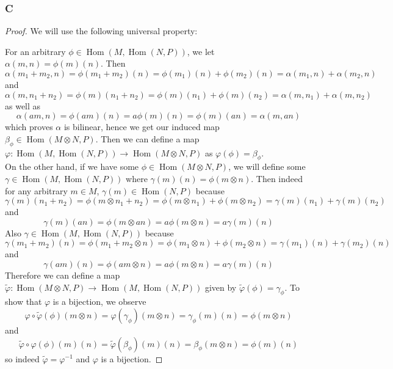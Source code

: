 \documentclass{article}
\DeclareMathOperator{\Hom}{Hom}
\begin{document}
\subsubsection{C}\label{1.5.C}
\begin{proof}
    We will use the following universal property:
    \begin{center}
    \end{center}
    For an arbitrary $\phi\in \Hom(M, \Hom(N,P))$, we let $\alpha(m,n)=\phi(m)(n)$. Then
    \[
    \alpha(m_1+m_2,n)=\phi(m_1+m_2)(n)=\phi(m_1)(n)+\phi(m_2)(n)=\alpha(m_1,n)+\alpha(m_2,n)
    \]
    and
    \[
    \alpha(m,n_1+n_2)=\phi(m)(n_1+n_2)=\phi(m)(n_1)+\phi(m)(n_2)=\alpha(m,n_1)+\alpha(m,n_2)
    \]
    as well as
    \[
    \alpha(am,n)=\phi(am)(n)=a\phi(m)(n)=\phi(m)(an)=\alpha(m,an)
    \]
    which proves $\alpha$ is bilinear, hence we get our induced map $\beta_\phi \in \Hom(M\otimes N, P)$. Then we can define a map $\varphi:\Hom(M, \Hom(N,P))\to \Hom(M\otimes N, P)$ as $\varphi(\phi)=\beta_\phi$.\\
    \newline
    On the other hand, if we have some $\phi \in \Hom(M\otimes N,P)$, we will define some $\gamma \in \Hom(M, \Hom(N,P))$ where $\gamma(m)(n)=\phi(m\otimes n)$. Then indeed for any arbitrary $m\in M$, $\gamma(m)\in \Hom(N,P)$ because
    \[
    \gamma(m)(n_1+n_2)=\phi(m\otimes n_1+n_2)=\phi(m\otimes n_1)+\phi(m\otimes n_2)=\gamma(m)(n_1)+\gamma(m)(n_2)
    \]
    and
    \[
    \gamma(m)(an)=\phi(m\otimes an)=a\phi(m\otimes n)=a\gamma(m)(n)
    \]
    Also $\gamma \in \Hom(M, \Hom(N,P))$ because
    \[
    \gamma(m_1+m_2)(n)=\phi(m_1+m_2\otimes n)=\phi(m_1\otimes n)+\phi(m_2\otimes n)=\gamma(m_1)(n)+\gamma(m_2)(n)
    \]
    and
    \[
    \gamma(am)(n)=\phi(am\otimes n)=a\phi(m\otimes n)=a\gamma(m)(n)
    \]
    Therefore we can define a map $\tilde \varphi:\Hom(M\otimes N,P)\to \Hom(M, \Hom(N,P))$ given by $\tilde \varphi(\phi)=\gamma_\phi$. To show that $\varphi$ is a bijection, we observe
    \[
    \varphi \circ \tilde \varphi(\phi)(m\otimes n)=\varphi(\gamma_\phi)(m\otimes n)=\gamma_\phi(m)(n)=\phi(m\otimes n)
    \]
    and
    \[
    \tilde \varphi\circ \varphi(\phi)(m)(n)=\tilde \varphi(\beta_\phi)(m)(n)=\beta_\phi(m\otimes n)=\phi(m)(n)
    \]
    so indeed $\tilde \varphi=\varphi^{-1}$ and $\varphi$ is a bijection.
\end{proof}
\end{document}
